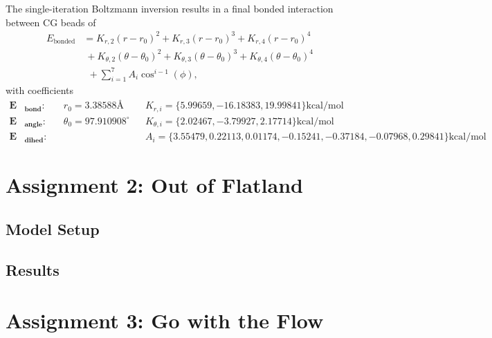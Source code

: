 \documentclass[10pt,a4paper]{labreport}
\begin{document}
\begin{itemize}
  The single-iteration Boltzmann inversion results in a final bonded interaction between CG beads of
  \begin{equation}
    \begin{split}
      E_\text{bonded} &= K_{r,2}(r - r_0)^2 +   K_{r,3}(r - r_0)^3 +  K_{r,4}(r - r_0)^4 \\
                      &~+ K_{\theta,2}(\theta - \theta_0)^2 +   K_{\theta,3}(\theta - \theta_0)^3 +  K_{\theta,4}(\theta - \theta_0)^4  \\
                      &~~+ \sum_{i=1}^7 A_i \cos^{i-1}(\phi),
    \end{split}
    \label{eq:ass1_final_bondendEng}
  \end{equation}
  with coefficients
  \begin{align*}
    \bm{E}&_\textbf{bond}: && r_0 =  3.38588 \text{\AA} && K_{r,i} = \{5.99659, -16.18383, 19.99841\}\text{kcal/mol} \\
    \bm{E}&_\textbf{angle}: && \theta_0 =  97.910908 ^\circ&& K_{\theta,i} = \{2.02467, -3.79927, 2.17714\}\text{kcal/mol} \\
    \bm{E}&_\textbf{dihed}: && && A_i = \{3.55479, 0.22113, 0.01174, -0.15241, -0.37184, -0.07968, 0.29841\}\text{kcal/mol}
  \end{align*}
  
\end{itemize}


\newpage
\section{Assignment 2: Out of Flatland}
\subsection{Model Setup}

\subsection{Results}

\newpage
\section{Assignment 3: Go with the Flow}
\newpage

%   
\end{document}

